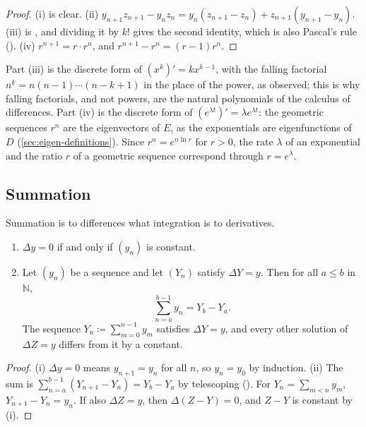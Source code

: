 \begin{proof}
(i) is clear. (ii) $y_{n+1}z_{n+1}-y_nz_n=y_n(z_{n+1}-z_n)+z_{n+1}(y_{n+1}-y_n)$. (iii) is , and dividing it by $k!$ gives the second identity, which is also Pascal's rule (). (iv) $r^{n+1}=r\cdot r^n$, and $r^{n+1}-r^n=(r-1)r^n$.
\end{proof}

Part (iii) is the discrete form of $(x^k)'=kx^{k-1}$, with the falling factorial $n^{\underline k}=n(n-1)\cdots(n-k+1)$ in the place of the power, as  observed; this is why falling factorials, and not powers, are the natural polynomials of the calculus of differences. Part (iv) is the discrete form of $(e^{\lambda t})'=\lambda e^{\lambda t}$: the geometric sequences $r^n$ are the eigenvectors of $E$, as the exponentials are eigenfunctions of $D$ (\cref{sec:eigen-definitions}). Since $r^n=e^{n\ln r}$ for $r>0$, the rate $\lambda$ of an exponential and the ratio $r$ of a geometric sequence correspond through $r=e^\lambda$.

\subsection{Summation}

Summation is to differences what integration is to derivatives.

\begin{theorem}
\label{thm:summation}
\leavevmode
\begin{enumerate}
\item $\Delta y=0$ if and only if $(y_n)$ is constant.
\item Let $(y_n)$ be a sequence and let $(Y_n)$ satisfy $\Delta Y=y$. Then for all $a\le b$ in $\mathbb N$,
\[
\sum_{n=a}^{b-1}y_n=Y_b-Y_a .
\]
The sequence $Y_n\coloneqq\sum_{m=0}^{n-1}y_m$ satisfies $\Delta Y=y$, and every other solution of $\Delta Z=y$ differs from it by a constant.
\end{enumerate}
\end{theorem}

\begin{proof}
(i) $\Delta y=0$ means $y_{n+1}=y_n$ for all $n$, so $y_n=y_0$ by induction. (ii) The sum is $\sum_{n=a}^{b-1}(Y_{n+1}-Y_n)=Y_b-Y_a$ by telescoping (). For $Y_n=\sum_{m<n}y_m$, $Y_{n+1}-Y_n=y_n$. If also $\Delta Z=y$, then $\Delta(Z-Y)=0$, and $Z-Y$ is constant by (i).
\end{proof}

